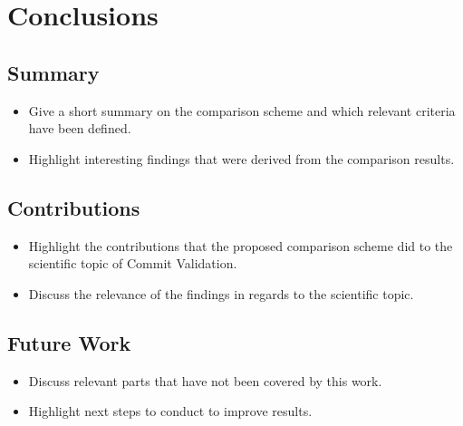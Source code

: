 \section{Conclusions}

\subsection{Summary}
\begin{itemize}
	\item Give a short summary on the comparison scheme and which relevant criteria have been defined.
	\item Highlight interesting findings that were derived from the comparison results.
\end{itemize}

\subsection{Contributions}
\begin{itemize}
	\item Highlight the contributions that the proposed comparison scheme did to the scientific topic of Commit Validation.
	\item Discuss the relevance of the findings in regards to the scientific topic.
\end{itemize}

\subsection{Future Work}
\begin{itemize}
	\item Discuss relevant parts that have not been covered by this work.
	\item Highlight next steps to conduct to improve results.
\end{itemize}
